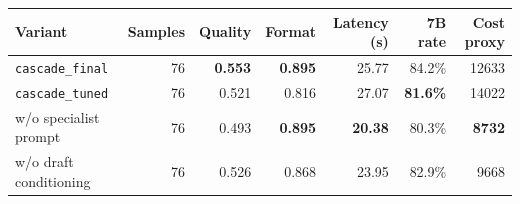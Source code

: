 \begin{tabular}{lrrrrrr}
\toprule
Variant & Samples & Quality & Format & Latency (s) & 7B rate & Cost proxy \\
\midrule
\rowcolor{paceTealLight}
\texttt{cascade\_final} & 76 & \textbf{0.553} & \textbf{0.895} & 25.77 & 84.2\% & 12633 \\
\texttt{cascade\_tuned} & 76 & 0.521 & 0.816 & 27.07 & \textbf{81.6\%} & 14022 \\
w/o specialist prompt & 76 & 0.493 & \textbf{0.895} & \textbf{20.38} & 80.3\% & \textbf{8732} \\
w/o draft conditioning & 76 & 0.526 & 0.868 & 23.95 & 82.9\% & 9668 \\
\bottomrule
\end{tabular}
